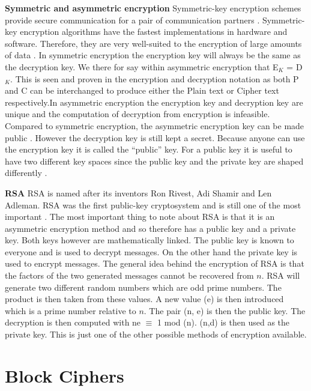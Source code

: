 \documentclass[11pt,a4paper]{report}
\begin{document}
\textbf{Symmetric and asymmetric encryption}
Symmetric-key encryption schemes provide secure communication for a pair of communication partners \cite{DBLP:series/isc/DelfsK07}. Symmetric-key encryption algorithms have the fastest implementations in hardware and software. Therefore, they are very well-suited to the encryption of large amounts of data \cite{DBLP:series/isc/DelfsK07}. In symmetric encryption the encryption key will always be the same as the decryption key. We there for say within asymmetric encryption that E$_{K}$ = D$_{K}$. This is seen and proven in the encryption and decryption notation as both P and C can be interchanged to produce either the Plain text or Cipher text respectively.In asymmetric encryption the encryption key and decryption key are unique and the computation of decryption from encryption is infeasible. Compared to symmetric encryption, the asymmetric encryption key can be made public \cite{DBLP:series/isc/DelfsK07}. However the decryption key is still kept a secret. Because anyone can use the encryption key it is called the “public” key. For a public key it is useful to have two different key spaces since the public key and the private key are shaped differently \cite{DBLP:series/isc/DelfsK07}.

\textbf{RSA}
RSA is named after its inventors Ron Rivest, Adi Shamir and Len Adleman. RSA was the first public-key cryptosystem and is still one of the most important \cite{DBLP:series/isc/DelfsK07}. The most important thing to note about RSA is that it is an asymmetric encryption method and so therefore has a public key and a private key. Both keys however are mathematically linked. The public key is known to everyone and is used to decrypt messages. On the other hand the private key is used to encrypt messages. The general idea behind the encryption of RSA is that the factors of the two generated messages cannot be recovered from $n$. RSA will generate two different random numbers which are odd prime numbers. The product is then taken from these values. A new value (e) is then introduced which is a prime number relative to $n$. The pair (n, e) is then the public key. The decryption is then computed with ne $\equiv$ 1 mod (n). (n,d) is then used as the private key. This is just one of the other possible methods of encryption available.



\section{Block Ciphers}
\label{sec:BCipher}
\end{document}
